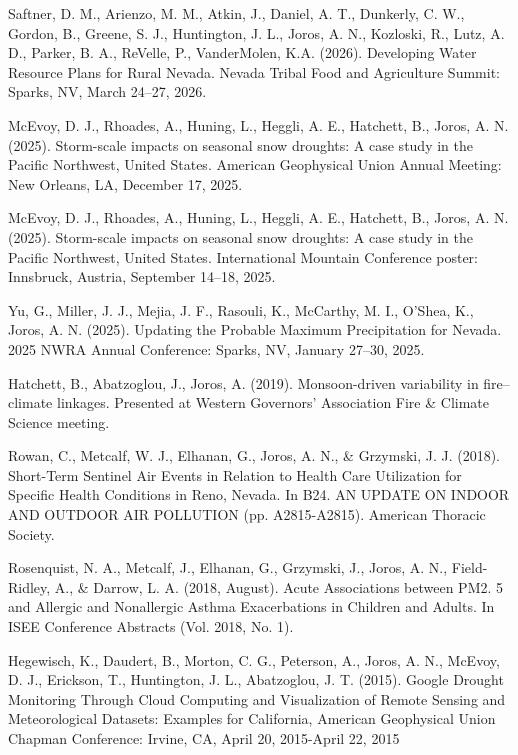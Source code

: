 \documentclass[letterpaper,11pt]{article}
\begin{document}
 \begin{enumerate}[leftmargin=0.25in, label=\arabic*.]
    \small{\item Saftner, D. M., Arienzo, M. M., Atkin, J., Daniel, A. T., Dunkerly, C. W., Gordon, B., Greene, S. J., Huntington, J. L., Joros, A. N., Kozloski, R., Lutz, A. D., Parker, B. A., ReVelle, P., VanderMolen, K.A. (2026). Developing Water Resource Plans for Rural Nevada. Nevada Tribal Food and Agriculture Summit: Sparks, NV, March 24--27, 2026.}
    \item McEvoy, D. J., Rhoades, A., Huning, L., Heggli, A. E., Hatchett, B., Joros, A. N. (2025). Storm-scale impacts on seasonal snow droughts: A case study in the Pacific Northwest, United States. American Geophysical Union Annual Meeting: New Orleans, LA, December 17, 2025.
    \item McEvoy, D. J., Rhoades, A., Huning, L., Heggli, A. E., Hatchett, B., Joros, A. N. (2025). Storm-scale impacts on seasonal snow droughts: A case study in the Pacific Northwest, United States. International Mountain Conference poster: Innsbruck, Austria, September 14--18, 2025.
    \item Yu, G., Miller, J. J., Mejia, J. F., Rasouli, K., McCarthy, M. I., O'Shea, K., Joros, A. N. (2025). Updating the Probable Maximum Precipitation for Nevada. 2025 NWRA Annual Conference: Sparks, NV, January 27--30, 2025.
    \item Hatchett, B., Abatzoglou, J., Joros, A. (2019). Monsoon-driven variability in fire--climate linkages. Presented at Western Governors' Association Fire \& Climate Science meeting.
    \item Rowan, C., Metcalf, W. J., Elhanan, G., Joros, A. N., \& Grzymski, J. J. (2018). Short-Term Sentinel Air Events in Relation to Health Care Utilization for Specific Health Conditions in Reno, Nevada. In B24. AN UPDATE ON INDOOR AND OUTDOOR AIR POLLUTION (pp. A2815-A2815). American Thoracic Society.
    \item Rosenquist, N. A., Metcalf, J., Elhanan, G., Grzymski, J., Joros, A. N., Field-Ridley, A., \& Darrow, L. A. (2018, August). Acute Associations between PM2. 5 and Allergic and Nonallergic Asthma Exacerbations in Children and Adults. In ISEE Conference Abstracts (Vol. 2018, No. 1).
    \item Hegewisch, K., Daudert, B., Morton, C. G., Peterson, A., Joros, A. N., McEvoy, D. J., Erickson, T., Huntington, J. L., Abatzoglou, J. T. (2015). Google Drought Monitoring Through Cloud Computing and Visualization of Remote Sensing and Meteorological Datasets: Examples for California, American Geophysical Union Chapman Conference: Irvine, CA, April 20, 2015-April 22, 2015

\end{enumerate}
\end{document}
